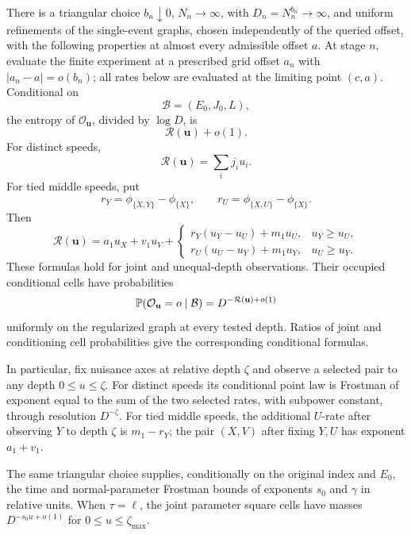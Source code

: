 \begin{lemma}
\label{lem:blowup-counts}
There is a triangular choice $b_n\downarrow0$, $N_n\to\infty$,
with $D_n=N_n^{b_n}\to\infty$, and uniform refinements of the
single-event graphs, chosen independently of the queried offset,
with the following properties at almost every admissible offset
$a$. At stage $n$, evaluate the finite experiment at a prescribed
grid offset $a_n$ with $|a_n-a|=o(b_n)$; all rates below are
evaluated at the limiting point $(c,a)$. Conditional on
\[
 \mathcal B=(E_0,J_0,L),
\]
the entropy of $\mathcal O_{\mathbf u}$, divided by $\log D$, is
\begin{equation}
 \mathcal R(\mathbf u)+o(1).
\label{pr:local-entropy-formula}
\end{equation}
For distinct speeds,
\[
 \mathcal R(\mathbf u)=\sum_i j_i u_i.
\]
For tied middle speeds, put
\[
 r_Y=\phi_{\{X,Y\}}-\phi_{\{X\}},\qquad
 r_U=\phi_{\{X,U\}}-\phi_{\{X\}}.
\]
Then
\begin{equation}
 \mathcal R(\mathbf u)
   =a_1u_X+v_1u_V+
 \begin{cases}
    r_Y(u_Y-u_U)+m_1u_U,&u_Y\ge u_U,\\
    r_U(u_U-u_Y)+m_1u_Y,&u_U\ge u_Y.
 \end{cases}
\label{pr:tied-rectangle}
\end{equation}
These formulas hold for joint and unequal-depth observations.
Their occupied conditional cells have probabilities
\begin{equation}
 \mathbb P(\mathcal O_{\mathbf u}=o\mid\mathcal B)
      =D^{-\mathcal R(\mathbf u)+o(1)}
\label{pr:local-cell-masses}
\end{equation}
uniformly on the regularized graph at every tested depth.
Ratios of joint and conditioning cell probabilities give the
corresponding conditional formulas.

In particular, fix nuisance axes at relative depth $\zeta$ and
observe a selected pair to any depth $0\le u\le\zeta$.
For distinct speeds its conditional point law is Frostman of
exponent equal to the sum of the two selected rates, with subpower
constant, through resolution $D^{-\zeta}$.
For tied middle speeds, the additional $U$-rate after observing
$Y$ to depth $\zeta$ is $m_1-r_Y$; the pair $(X,V)$ after fixing
$Y,U$ has exponent $a_1+v_1$.

The same triangular choice supplies, conditionally on the original
index and $E_0$, the time and normal-parameter Frostman bounds of
exponents $s_0$ and $\gamma$ in relative units.
When $\tau=\ell$, the joint parameter square cells have masses
$D^{-s_0u+o(1)}$ for $0\le u\le\zeta_{\max}$.
\end{lemma}

